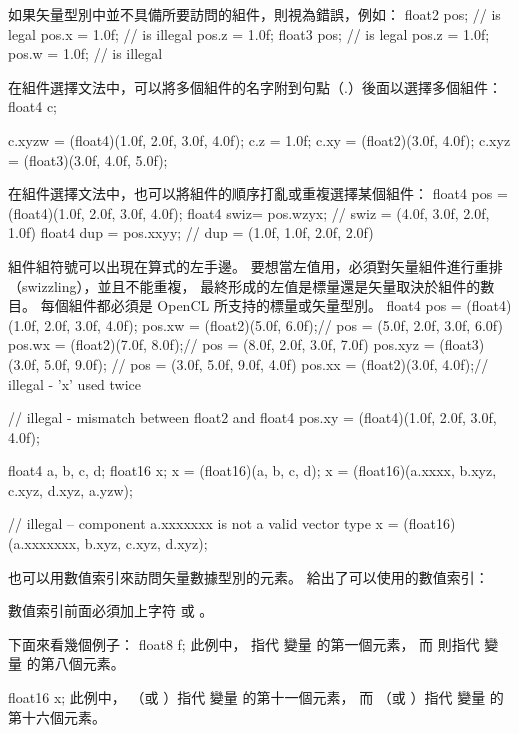 如果矢量型別中並不具備所要訪問的組件，則視為錯誤，例如：
\startclc
float2 pos;	// is legal
pos.x = 1.0f;	// is illegal
pos.z = 1.0f;
float3 pos;	// is legal
pos.z = 1.0f;
pos.w = 1.0f;	// is illegal
\stopclc

在組件選擇文法中，可以將多個組件的名字附到句點（.）後面以選擇多個組件：
\startclc
float4 c;

c.xyzw = (float4)(1.0f, 2.0f, 3.0f, 4.0f);
c.z = 1.0f;
c.xy = (float2)(3.0f, 4.0f);
c.xyz = (float3)(3.0f, 4.0f, 5.0f);
\stopclc

在組件選擇文法中，也可以將組件的順序打亂或重複選擇某個組件：
\startclc
float4 pos = (float4)(1.0f, 2.0f, 3.0f, 4.0f);
float4 swiz= pos.wzyx; // swiz = (4.0f, 3.0f, 2.0f, 1.0f)
float4 dup = pos.xxyy; // dup = (1.0f, 1.0f, 2.0f, 2.0f)
\stopclc

組件組符號可以出現在算式的左手邊。
要想當左值用，必須對矢量組件進行重排（swizzling），並且不能重複，
最終形成的左值是標量還是矢量取決於組件的數目。
每個組件都必須是 OpenCL 所支持的標量或矢量型別。
\startclc
float4 pos = (float4)(1.0f, 2.0f, 3.0f, 4.0f);
pos.xw = (float2)(5.0f, 6.0f);// pos = (5.0f, 2.0f, 3.0f, 6.0f)
pos.wx = (float2)(7.0f, 8.0f);// pos = (8.0f, 2.0f, 3.0f, 7.0f)
pos.xyz = (float3)(3.0f, 5.0f, 9.0f); // pos = (3.0f, 5.0f, 9.0f, 4.0f)
pos.xx = (float2)(3.0f, 4.0f);// illegal - 'x' used twice

// illegal - mismatch between float2 and float4
pos.xy = (float4)(1.0f, 2.0f, 3.0f, 4.0f);

float4 a, b, c, d;
float16 x;
x = (float16)(a, b, c, d);
x = (float16)(a.xxxx, b.xyz, c.xyz, d.xyz, a.yzw);

// illegal – component a.xxxxxxx is not a valid vector type
x = (float16)(a.xxxxxxx, b.xyz, c.xyz, d.xyz);
\stopclc

也可以用數值索引來訪問矢量數據型別的元素。
給出了可以使用的數值索引：

{}

數值索引前面必須加上字符  或 。

下面來看幾個例子：
\startclc[indentnext=no]
float8	f;
\stopclc
此例中，
 指代  變量  的第一個元素，
而  則指代  變量  的第八個元素。

\startclc[indentnext=no]
float16	x;
\stopclc
此例中，
 （或 ）指代  變量  的第十一個元素，
而  （或 ）指代  變量  的第十六個元素。

